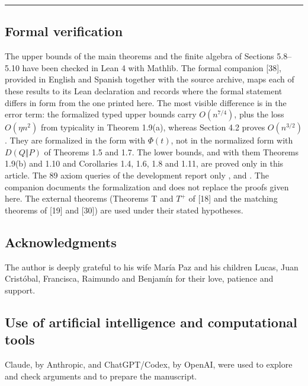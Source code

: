 \documentclass[english,11pt,a4paper]{article}
\begin{document}
\begin{center}\rule{0.5\linewidth}{0.5pt}\end{center}

\subsection{Formal verification}\label{formal-verification}

The upper bounds of the main theorems and the finite algebra of Sections 5.8--5.10 have been checked in Lean 4 with Mathlib. The formal companion {[}38{]}, provided in English and Spanish together with the source archive, maps each of these results to its Lean declaration and records where the formal statement differs in form from the one printed here. The most visible difference is in the error term: the formalized typed upper bounds carry \(O(n^{7/4})\), plus the loss \(O(\eta n^2)\) from typicality in Theorem 1.9(a), whereas Section 4.2 proves \(O(n^{3/2})\). They are formalized in the form with \(\Phi(t)\), not in the normalized form with \(D(Q\Vert P)\) of Theorems 1.5 and 1.7. The lower bounds, and with them Theorems 1.9(b) and 1.10 and Corollaries 1.4, 1.6, 1.8 and 1.11, are proved only in this article. The 89 axiom queries of the development report only \mbox{}, \mbox{} and \mbox{}. The companion documents the formalization and does not replace the proofs given here. The external theorems (Theorems T and \(T^+\) of {[}18{]} and the matching theorems of {[}19{]} and {[}30{]}) are used under their stated hypotheses.

\subsection{Acknowledgments}\label{acknowledgments}

The author is deeply grateful to his wife María Paz and his children Lucas, Juan Cristóbal, Francisca, Raimundo and Benjamín for their love, patience and support.

\subsection{Use of artificial intelligence and computational tools}\label{use-of-artificial-intelligence-and-computational-tools}

Claude, by Anthropic, and ChatGPT/Codex, by OpenAI, were used to explore and check arguments and to prepare the manuscript.
\end{document}
